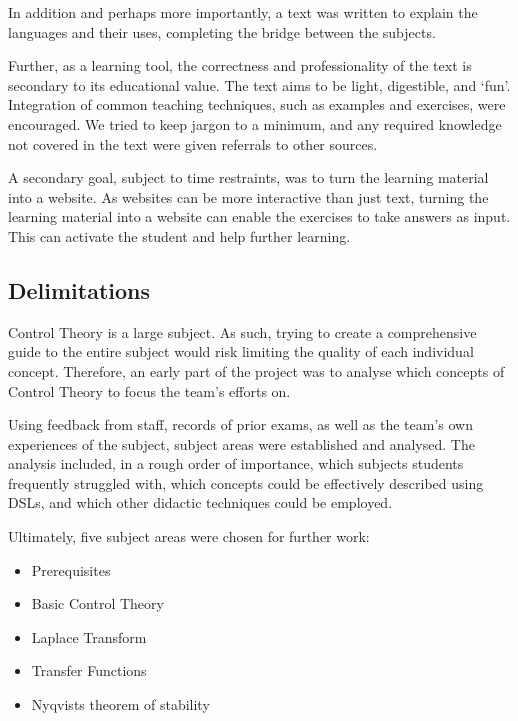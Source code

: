 In addition and perhaps more importantly, a text was written to explain the languages and their uses, completing the bridge between the subjects.

Further, as a learning tool, the correctness and professionality of the text is secondary to its educational value. The text aims to be light, digestible, and `fun'. Integration of common teaching techniques, such as examples and exercises, were encouraged. We tried to keep jargon to a minimum, and any required knowledge not covered in the text were given referrals to other sources.


A secondary goal, subject to time restraints, was to turn the learning material into a website. As websites can be more interactive than just text, turning the learning material into a website can enable the exercises to take answers as input. This can activate the student and help further learning. 

\subsection{Delimitations}\label{sec:delimitation}
Control Theory is a large subject. As such, trying to create a comprehensive guide to the entire subject would risk limiting the quality of each individual concept. Therefore, an early part of the project was to analyse which concepts of Control Theory to focus the team's efforts on. %


Using feedback from staff, records of prior exams, as well as the team's own experiences of the subject, subject areas were established and analysed. The analysis included, in a rough order of importance, which subjects students frequently struggled with, which concepts could be effectively described using DSLs, and which other didactic techniques could be employed.

Ultimately, five subject areas were chosen for further work:
\begin{itemize}
    \item Prerequisites
    \item Basic Control Theory
    \item Laplace Transform
    \item Transfer Functions
    \item Nyqvists theorem of stability
\end{itemize}

